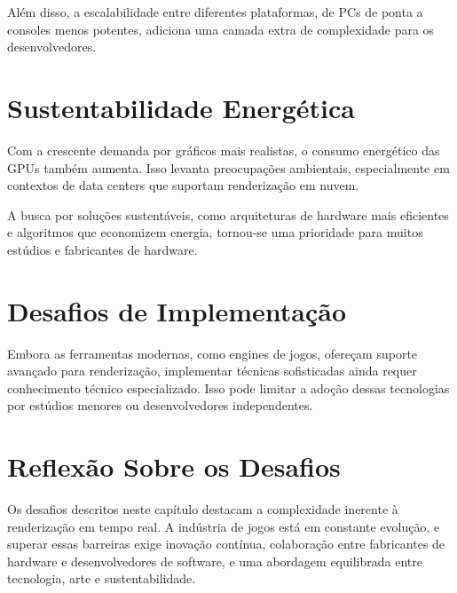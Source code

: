 Além disso, a escalabilidade entre diferentes plataformas, de PCs de ponta a consoles menos potentes, adiciona uma camada extra de complexidade para os desenvolvedores.

\section{Sustentabilidade Energética}
Com a crescente demanda por gráficos mais realistas, o consumo energético das GPUs também aumenta. Isso levanta preocupações ambientais, especialmente em contextos de data centers que suportam renderização em nuvem.

A busca por soluções sustentáveis, como arquiteturas de hardware mais eficientes e algoritmos que economizem energia, tornou-se uma prioridade para muitos estúdios e fabricantes de hardware.

\section{Desafios de Implementação}
Embora as ferramentas modernas, como engines de jogos, ofereçam suporte avançado para renderização, implementar técnicas sofisticadas ainda requer conhecimento técnico especializado. Isso pode limitar a adoção dessas tecnologias por estúdios menores ou desenvolvedores independentes.

\section{Reflexão Sobre os Desafios}
Os desafios descritos neste capítulo destacam a complexidade inerente à renderização em tempo real. A indústria de jogos está em constante evolução, e superar essas barreiras exige inovação contínua, colaboração entre fabricantes de hardware e desenvolvedores de software, e uma abordagem equilibrada entre tecnologia, arte e sustentabilidade.

